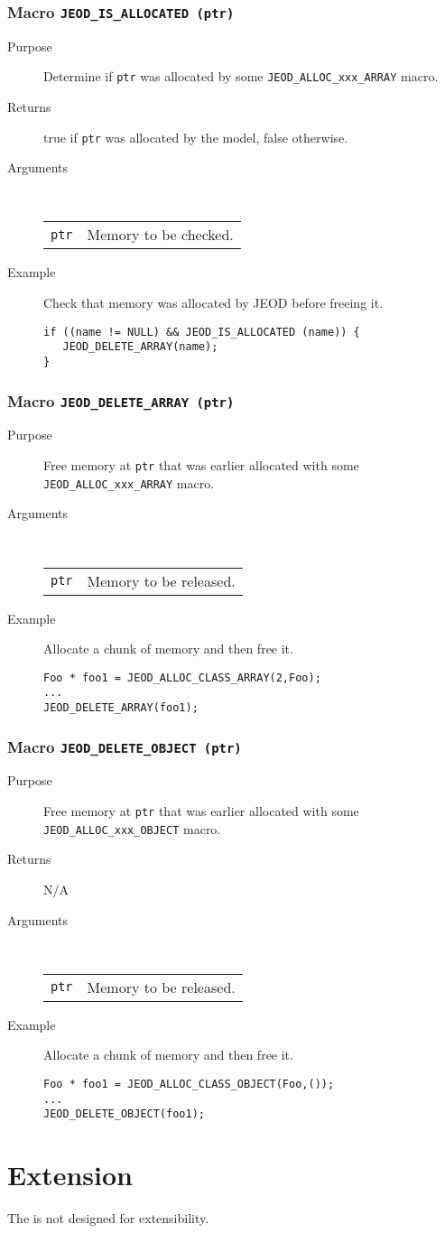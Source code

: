 \subsubsection{Macro {\tt JEOD\_IS\_ALLOCATED (ptr)}}
\begin{description}
\item[Purpose]
Determine if {\tt ptr} was allocated by some
\verb|JEOD_ALLOC_xxx_ARRAY| macro.
\item[Returns]
true if {\tt ptr} was allocated by the model, false otherwise.
\item[Arguments] \ \\
\begin{tabular}{@{}ll}
{\tt ptr} &  Memory to be checked.
\end{tabular}
\item[Example]
Check that memory was allocated by JEOD before freeing it.
\begin{verbatim}
if ((name != NULL) && JEOD_IS_ALLOCATED (name)) {
   JEOD_DELETE_ARRAY(name);
}
\end{verbatim}
\end{description}

\subsubsection{Macro {\tt JEOD\_DELETE\_ARRAY (ptr)}}
\begin{description}
\item[Purpose]
Free memory at {\tt ptr} that was earlier allocated with some
{\tt JEOD\_ALLOC\_xxx\_ARRAY} macro.
\item[Arguments] \ \\
\begin{tabular}{@{}ll}
{\tt ptr} &  Memory to be released.
\end{tabular}
\item[Example]
Allocate a chunk of memory and then free it.
\begin{verbatim}
Foo * foo1 = JEOD_ALLOC_CLASS_ARRAY(2,Foo);
...
JEOD_DELETE_ARRAY(foo1);
\end{verbatim}
\end{description}

\subsubsection{Macro {\tt JEOD\_DELETE\_OBJECT (ptr)}}
\begin{description}
\item[Purpose]
Free memory at {\tt ptr} that was earlier allocated with some
{\tt JEOD\_ALLOC\_xxx\_OBJECT} macro.
\item[Returns] N/A
\item[Arguments] \ \\
\begin{tabular}{@{}ll}
{\tt ptr} &  Memory to be released.
\end{tabular}
\item[Example]
Allocate a chunk of memory and then free it.
\begin{verbatim}
Foo * foo1 = JEOD_ALLOC_CLASS_OBJECT(Foo,());
...
JEOD_DELETE_OBJECT(foo1);
\end{verbatim}
\end{description}

\section{Extension}
The \ModelDesc is not designed for extensibility.